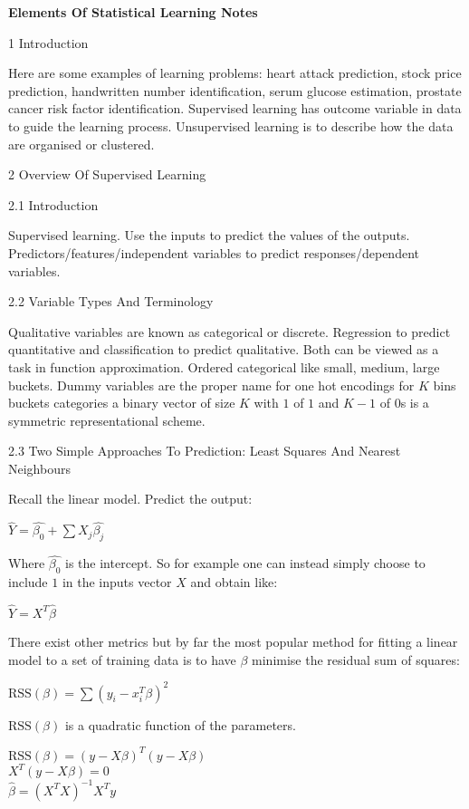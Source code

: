 \Large
\twocolumn

\textbf{Elements Of Statistical Learning Notes}

1 Introduction

Here are some examples of learning problems: heart attack prediction, stock price prediction, handwritten number identification, serum glucose estimation, prostate cancer risk factor identification. Supervised learning has outcome variable in data to guide the learning process. Unsupervised learning is to describe how the data are organised or clustered.

2 Overview Of Supervised Learning

2.1 Introduction

Supervised learning. Use the inputs to predict the values of the outputs. Predictors/features/independent variables to predict responses/dependent variables.

2.2 Variable Types And Terminology

Qualitative variables are known as categorical or discrete. Regression to predict quantitative and classification to predict qualitative. Both can be viewed as a task in function approximation. Ordered categorical like small, medium, large buckets. Dummy variables are the proper name for one hot encodings for $K$ bins buckets categories a binary vector of size $K$ with $1$ of $1$ and $K-1$ of $0$s is a symmetric representational scheme.

2.3 Two Simple Approaches To Prediction: Least Squares And Nearest Neighbours

Recall the linear model. Predict the output:

$\hat{Y} = \hat{\beta_0}+\sum X_j \hat{\beta_j}$

Where $\hat{\beta_0}$ is the intercept. So for example one can instead simply choose to include $1$ in the inputs vector $X$ and obtain like:

$\hat{Y} = X^T \hat{\beta}$

There exist other metrics but by far the most popular method for fitting a linear model to a set of training data is to have $\beta$ minimise the residual sum of squares:

$\text{RSS}(\beta) = \sum (y_i-x_i^T \beta)^2$

$\text{RSS}(\beta)$ is a quadratic function of the parameters.

$\text{RSS}(\beta) = (y-X \beta)^T(y-X \beta)$ \\
$X^T(y-X \beta) = 0$ \\
$\hat{\beta} = (X^T X)^{-1} X^T y$

